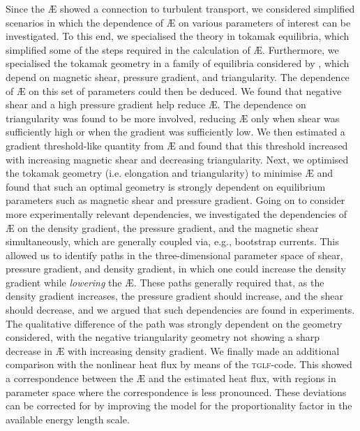 Since the \AE{} showed a connection to turbulent transport, we considered simplified scenarios in which the dependence of \AE{} on various parameters of interest can be investigated. To this end, we specialised the theory in tokamak equilibria, which simplified some of the steps required in the calculation of \AE{}. Furthermore, we specialised the tokamak geometry in a family of equilibria considered by \citet{miller1998noncircular}, which depend on magnetic shear, pressure gradient, and triangularity. The dependence of \AE{} on this set of parameters could then be deduced. We found that negative shear and a high pressure gradient help reduce \AE{}. The dependence on triangularity was found to be more involved, reducing \AE{} only when shear was sufficiently high or when the gradient was sufficiently low. We then estimated a gradient threshold-like quantity from \AE{} and found that this threshold increased with increasing magnetic shear and decreasing triangularity. Next, we optimised the tokamak geometry (i.e. elongation and triangularity) to minimise \AE{} and found that such an optimal geometry is strongly dependent on equilibrium parameters such as magnetic shear and pressure gradient. Going on to consider more experimentally relevant dependencies, we investigated the dependencies of \AE{} on the density gradient, the pressure gradient, and the magnetic shear simultaneously, which are generally coupled via, e.g., bootstrap currents. This allowed us to identify paths in the three-dimensional parameter space of shear, pressure gradient, and density gradient, in which one could increase the density gradient while {\it lowering} the \AE{}. These paths generally required that, as the density gradient increases, the pressure gradient should increase, and the shear should decrease, and we argued that such dependencies are found in experiments. The qualitative difference of the path was strongly dependent on the geometry considered, with the negative triangularity geometry not showing a sharp decrease in \AE{} with increasing density gradient. We finally made an additional comparison with the nonlinear heat flux by means of the \textsc{tglf}-code. This showed a correspondence between the \AE{} and the estimated heat flux, with regions in parameter space where the correspondence is less pronounced. These deviations can be corrected for by improving the model for the proportionality factor in the available energy length scale.  \par 

